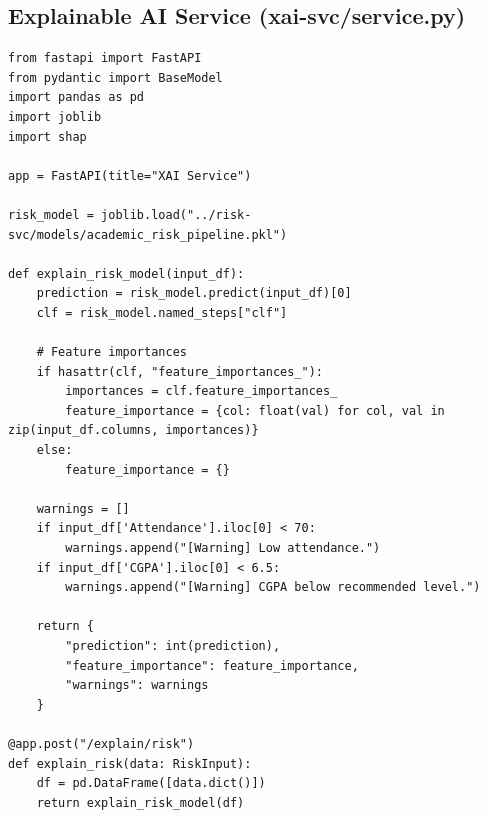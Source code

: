 \documentclass[12pt,a4paper]{report}
\begin{document}
\subsection{Explainable AI Service (xai-svc/service.py)}
\begin{footnotesize}
\begin{verbatim}
from fastapi import FastAPI
from pydantic import BaseModel
import pandas as pd
import joblib
import shap

app = FastAPI(title="XAI Service")

risk_model = joblib.load("../risk-svc/models/academic_risk_pipeline.pkl")

def explain_risk_model(input_df):
    prediction = risk_model.predict(input_df)[0]
    clf = risk_model.named_steps["clf"]

    # Feature importances
    if hasattr(clf, "feature_importances_"):
        importances = clf.feature_importances_
        feature_importance = {col: float(val) for col, val in zip(input_df.columns, importances)}
    else:
        feature_importance = {}

    warnings = []
    if input_df['Attendance'].iloc[0] < 70:
        warnings.append("[Warning] Low attendance.")
    if input_df['CGPA'].iloc[0] < 6.5:
        warnings.append("[Warning] CGPA below recommended level.")

    return {
        "prediction": int(prediction),
        "feature_importance": feature_importance,
        "warnings": warnings
    }

@app.post("/explain/risk")
def explain_risk(data: RiskInput):
    df = pd.DataFrame([data.dict()])
    return explain_risk_model(df)
\end{verbatim}
\end{footnotesize}
\end{document}
